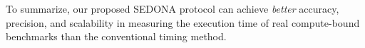 \documentclass[letter]{ieice}
\begin{document}

To summarize, our proposed SEDONA protocol can achieve {\em better} accuracy,
precision, and scalability in measuring the execution time of real \hbox{compute-bound} benchmarks 
than the conventional timing method.

\vspace{-0.1in}
\end{document}
